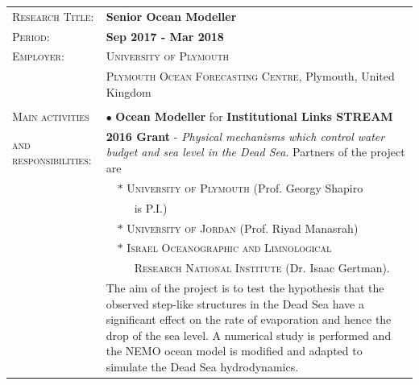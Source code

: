 \documentclass[a4paper, oneside, final]{scrartcl}
\newcommand{\gray}{\rowcolor[gray]{.90}} %
\begin{document}

\begin{tabularx}{0.97\linewidth}{>{\raggedright\scshape}p{4.4cm}|X}
\gray \textsc{Research Title:}  & \textbf{Senior Ocean Modeller}\\
\gray \textsc{Period:}          & \textbf{Sep 2017 - Mar 2018}\\
\textsc{Employer:}        & \textsc{University of Plymouth} \\
                          & \textsc{Plymouth Ocean Forecasting Centre}, Plymouth, United Kingdom\\
                                & \\
\textsc{Main activities}        & $\bullet$  \textbf{Ocean Modeller} for \textbf{Institutional Links STREAM} \\
\textsc{and responsibilities:}  & \textbf{2016 Grant} - \textit{Physical mechanisms which control water budget and sea level in the Dead Sea}. Partners of the project are \\
                                 & \ \ $\ast$ \textsc{University of Plymouth} (Prof. Georgy Shapiro \\
                                 & \ \ \ \ \ is P.I.) \\ 
                                 & \ \ $\ast$ \textsc{University of Jordan} (Prof. Riyad Manasrah) \\
                                 & \ \ $\ast$ \textsc{Israel Oceanographic and Limnological} \\
                                 & \ \ \ \ \ \textsc{Research National Institute} (Dr. Isaac Gertman). \\
                                 & The aim of the project is to test the hypothesis that the observed step-like structures in the Dead Sea have a significant effect on the rate of evaporation and hence the drop of the sea level. A numerical study is performed and the NEMO ocean model is modified and adapted to simulate the Dead Sea hydrodynamics. \\
\end{tabularx}
\end{document}
